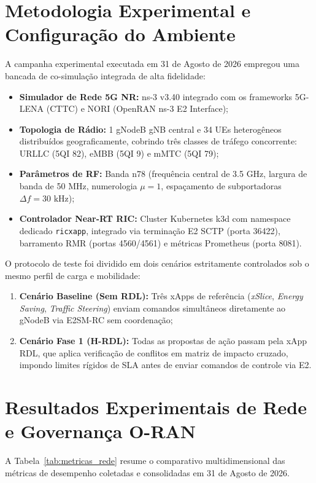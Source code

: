 \documentclass[10pt,journal,compsoc,a4paper]{IEEEtran}
\begin{document}
\section{Metodologia Experimental e Configuração do Ambiente}
A campanha experimental executada em 31 de Agosto de 2026 empregou uma bancada de co-simulação integrada de alta fidelidade:
\begin{itemize}
    \item \textbf{Simulador de Rede 5G NR:} ns-3 v3.40 integrado com os frameworks 5G-LENA (CTTC) e NORI (OpenRAN ns-3 E2 Interface);
    \item \textbf{Topologia de Rádio:} 1 gNodeB gNB central e 34 UEs heterogêneos distribuídos geograficamente, cobrindo três classes de tráfego concorrente: URLLC (5QI 82), eMBB (5QI 9) e mMTC (5QI 79);
    \item \textbf{Parâmetros de RF:} Banda n78 (frequência central de 3.5 GHz, largura de banda de 50 MHz, numerologia $\mu=1$, espaçamento de subportadoras $\Delta f = 30\text{ kHz}$);
    \item \textbf{Controlador Near-RT RIC:} Cluster Kubernetes k3d com namespace dedicado \texttt{ricxapp}, integrado via terminação E2 SCTP (porta 36422), barramento RMR (portas 4560/4561) e métricas Prometheus (porta 8081).
\end{itemize}

O protocolo de teste foi dividido em dois cenários estritamente controlados sob o mesmo perfil de carga e mobilidade:
\begin{enumerate}
    \item \textbf{Cenário Baseline (Sem RDL):} Três xApps de referência (\textit{xSlice}, \textit{Energy Saving}, \textit{Traffic Steering}) enviam comandos simultâneos diretamente ao gNodeB via E2SM-RC sem coordenação;
    \item \textbf{Cenário Fase 1 (H-RDL):} Todas as propostas de ação passam pela xApp RDL, que aplica verificação de conflitos em matriz de impacto cruzado, impondo limites rígidos de SLA antes de enviar comandos de controle via E2.
\end{enumerate}

\section{Resultados Experimentais de Rede e Governança O-RAN}
A Tabela~\ref{tab:metricas_rede} resume o comparativo multidimensional das métricas de desempenho coletadas e consolidadas em 31 de Agosto de 2026.
\end{document}
